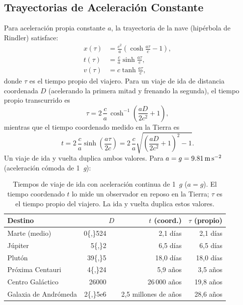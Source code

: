 \documentclass[12pt,a4paper]{article}
\newcommand{\AU}{\,\text{UA}}
\newcommand{\ly}{\,\text{al}}
\begin{document}
\subsection{Trayectorias de Aceleración Constante}

Para aceleración propia constante $a$, la trayectoria de la nave (hipérbola
de Rindler) satisface:
\begin{align}
  x(\tau) &= \frac{c^2}{a}\!\left(\cosh\frac{a\tau}{c} - 1\right),\\
  t(\tau)  &= \frac{c}{a}\sinh\frac{a\tau}{c},\\
  v(\tau)  &= c\tanh\frac{a\tau}{c},
\end{align}
donde $\tau$ es el tiempo propio del viajero. Para un viaje de ida de distancia
coordenada $D$ (acelerando la primera mitad y frenando la segunda), el tiempo
propio transcurrido es
\begin{equation}
  \tau = 2\,\frac{c}{a}\,\cosh^{-1}\!\!\left(\frac{aD}{2c^2}+1\right),
  \label{eq:oneway_proper_es}
\end{equation}
mientras que el tiempo coordenado medido en la Tierra es
\begin{equation}
  t = 2\,\frac{c}{a}\sinh\!\left(\frac{a\tau}{2c}\right)
    = 2\,\frac{c}{a}\sqrt{\left(\frac{aD}{2c^{2}}+1\right)^{2}-1}.
  \label{eq:oneway_coord_es}
\end{equation}
Un viaje de ida y vuelta duplica ambos valores. Para
$a = g = \SI{9{,}81}{\meter\per\second\squared}$ (aceleración cómoda de 1~\textit{g}):

\begin{table}[ht]
  \centering
  \caption{Tiempos de viaje de ida con aceleración continua de 1~$g$
   ($a=g$). El tiempo coordenado $t$ lo mide un observador en reposo en la
   Tierra; $\tau$ es el tiempo propio del viajero. La ida y vuelta duplica
   estos valores.}
  \label{tab:rel_trips_es}
  \begin{tabularx}{\textwidth}{X r r r}
    \toprule
    Destino & $D$ & $t$ (coord.) & $\tau$ (propio) \\
    \midrule
    Marte (medio)          & \SI{0{,}524}{\AU} & 2{,}1 días    & 2{,}1 días     \\
    Júpiter                & \SI{5{,}2}{\AU}   & 6{,}5 días    & 6{,}5 días     \\
    Plutón                 & \SI{39{,}5}{\AU}  & 18{,}0 días   & 18{,}0 días    \\
    Próxima Centauri       & \SI{4{,}24}{\ly}  & 5{,}9 años    & 3{,}5 años     \\
    Centro Galáctico       & \SI{26000}{\ly}   & 26\,000 años  & 19{,}8 años    \\
    Galaxia de Andrómeda   & \SI{2{,}5e6}{\ly} & 2{,}5 millones de años & 28{,}6 años \\
    \bottomrule
  \end{tabularx}
\end{table}
\end{document}
